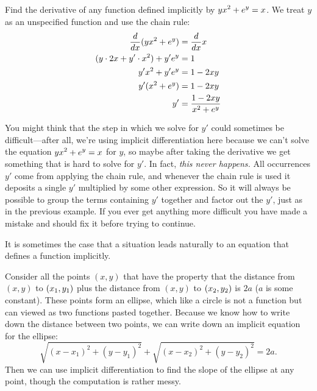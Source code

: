 \begin{example}
Find the derivative of any function defined implicitly by 
$\displaystyle yx^2+e^y=x$. We treat $y$ as an unspecified function and use the
chain rule:
\begin{align*}
{d\over dx}(yx^2+e^y)&={d\over dx}x \\
(y\cdot 2x+y'\cdot x^2)+y'e^y &= 1 \\
y'x^2+y'e^y&= 1-2xy \\
y'(x^2+e^y)&= 1-2xy \\
y'&={1-2xy\over x^2+e^y} \\
\end{align*}
\vskip-18pt\end{example}

You might think that the step in which we solve for $y'$ could
sometimes be difficult---after all, we're using implicit
differentiation here because we can't solve the equation
$\displaystyle yx^2+e^y=x$ for $y$, so maybe after taking the derivative we get
something that is hard to solve for $y'$. In fact, {\it this never
  happens.} All occurrences $y'$ come from applying the chain rule,
and whenever the chain rule is used it deposits a single $y'$
multiplied by some other expression. So it will always be possible to
group the terms containing $y'$ together and factor out the $y'$, just
as in the previous example. If you ever get anything more difficult
you have made a mistake and should fix it before trying to continue.

It is sometimes the case that a situation leads naturally to an
equation that defines a function implicitly. 

\begin{example} Consider all the points $(x,y)$ that have the property that 
the distance from $(x,y)$ to $\displaystyle (x_1,y_1)$ plus the distance 
from $(x,y)$ to $\displaystyle (x_2,y_2)$ is $2a$ ($a$ is some constant). These
points form an ellipse, which like a circle is not a function but can
viewed as two functions pasted together. Because we know how to write
down the distance between two points, we can write down an implicit
equation for the ellipse:
$$\sqrt{(x-x_1)^2+(y-y_1)^2}+\sqrt{(x-x_2)^2+(y-y_2)^2}=2a.$$
Then we can use implicit differentiation to find the slope of the
ellipse at any point, though the computation is rather messy.
\label{example:ellipse}
\end{example}


